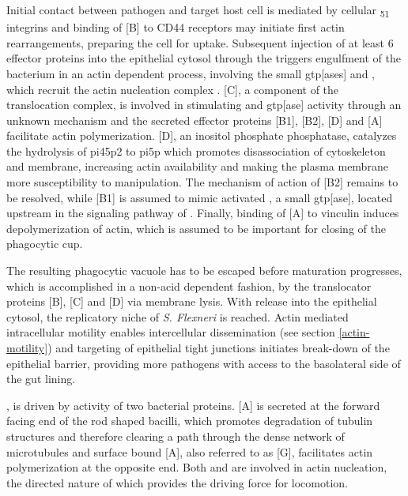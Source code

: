 Initial contact between pathogen and target host cell is mediated by cellular \textalpha\textsubscript{5}\textbeta\textsubscript{1} integrins and binding of [B] to CD44 receptors may initiate first actin rearrangements, preparing the cell for uptake. Subsequent injection of at least 6 effector proteins into the epithelial cytosol through the  triggers engulfment of the bacterium in an actin dependent process, involving the small \acrshort{gtp}[ases]  and , which recruit the actin nucleation complex . [C], a component of the translocation complex, is involved in stimulating  and  \acrshort{gtp}[ase] activity through an unknown mechanism and the secreted effector proteins [B1], [B2], [D] and [A] facilitate actin polymerization. [D], an inositol phosphate phosphatase, catalyzes the hydrolysis of \acrshort{pi45p2} to \acrshort{pi5p} which promotes disassociation of cytoskeleton and membrane, increasing actin availability and making the plasma membrane more susceptibility to manipulation. The mechanism of action of [B2] remains to be resolved, while [B1] is assumed to mimic activated , a small \acrshort{gtp}[ase], located upstream in the signaling pathway of . Finally, binding of [A] to vinculin induces depolymerization of actin, which is assumed to be important for closing of the phagocytic cup.

The resulting phagocytic vacuole has to be escaped before maturation progresses, which is accomplished in a non-acid dependent fashion, by the translocator proteins [B], [C] and [D] via membrane lysis. With release into the epithelial cytosol, the replicatory niche of \textit{S. Flexneri} is reached. Actin mediated intracellular motility enables intercellular dissemination (see section \ref{actin-motility}) and targeting of epithelial tight junctions initiates break-down of the epithelial barrier, providing more pathogens with access to the basolateral side of the gut lining.

, is driven by activity of two bacterial proteins. [A] is secreted at the forward facing end of the rod shaped bacilli, which promotes degradation of tubulin structures and therefore clearing a path through the dense network of microtubules and surface bound [A], also referred to as [G], facilitates actin polymerization at the opposite end. Both  and  are involved in actin nucleation, the directed nature of which provides the driving force for locomotion.

